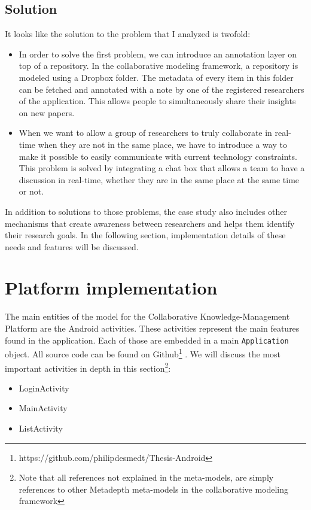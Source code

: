 \subsection{Solution}

It looks like the solution to the problem that I analyzed is twofold:
\begin{itemize}
\item{In order to solve the first problem, we can introduce an annotation layer on top of a repository. In the collaborative modeling framework, a repository is modeled using a Dropbox folder. The metadata of every item in this folder can be fetched and annotated with a note by one of the registered researchers of the application. This allows people to simultaneously share their insights on new papers.} 
\item{When we want to allow a group of researchers to truly collaborate in real-time when they are not in the same place, we have to introduce a way to make it possible to easily communicate with current technology constraints. This problem is solved by integrating a chat box that allows a team to have a discussion in real-time, whether they are in the same place at the same time or not.}
\end{itemize}
In addition to solutions to those problems, the case study also includes other mechanisms that create awareness between researchers and helps them identify their research goals. In the following section, implementation details of these needs and features will be discussed.

\section{Platform implementation}

The main entities of the model for the Collaborative Knowledge-Management Platform are the Android activities. These activities represent the main features found in the application. Each of those are embedded in a main \texttt{Application} object. All source code can be found on Github\footnote{https://github.com/philipdesmedt/Thesis-Android} \cite{Github}. We will discuss the most important activities in depth in this section\footnote{Note that all references not explained in the meta-models, are simply references to other Metadepth meta-models in the collaborative modeling framework}:
\begin{itemize}
\item{LoginActivity}
\item{MainActivity}
\item{ListActivity}
\end{itemize} 

